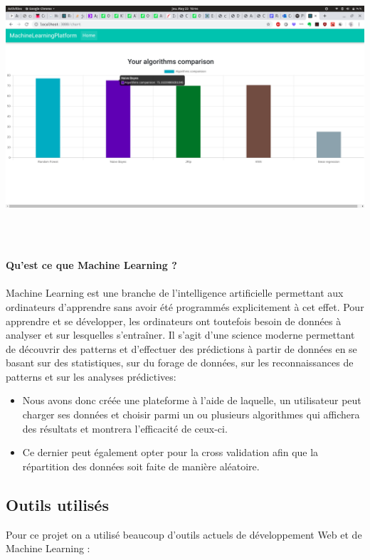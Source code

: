 \documentclass[a4paper,11pt]{article}
\begin{document}
\includegraphics[width=17cm, height=10cm]{algoComparison.png}\\\\

\textbf{Qu'est ce que Machine Learning ?}\\\\

Machine Learning est une branche de l'intelligence artificielle permettant aux ordinateurs d'apprendre sans avoir été programmés explicitement à cet effet.
Pour apprendre et se développer, les ordinateurs ont toutefois besoin de données à analyser et sur lesquelles s'entraîner.
Il s'agit d'une science moderne permettant de découvrir des patterns et d'effectuer des prédictions
à partir de données en se basant sur des statistiques, sur du forage de données, sur
les reconnaissances de patterns et sur les analyses prédictives:

\begin{itemize}
    \item Nous avons donc créée une plateforme à l’aide de
     laquelle, un utilisateur peut charger ses données
    et choisir parmi un ou plusieurs algorithmes qui affichera des résultats et montrera l’efficacité de ceux-ci.

    \item Ce dernier peut également opter pour la cross validation afin que la répartition des données soit faite de manière aléatoire.

\end{itemize}



\subsection{Outils utilisés}
Pour ce projet on a utilisé beaucoup d'outils actuels de développement Web et de Machine Learning :
\end{document}
